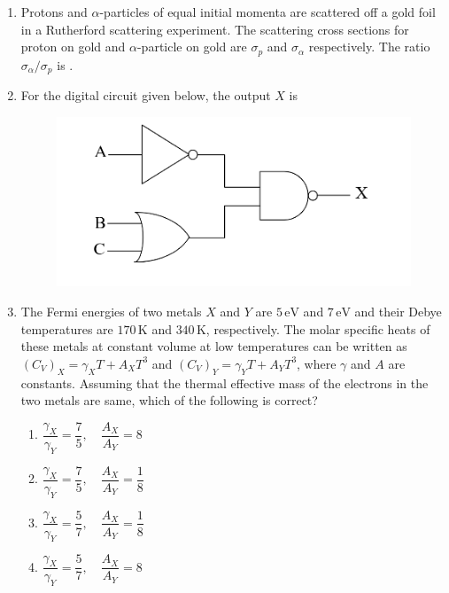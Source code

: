 \documentclass[journal,12pt,onecolumn]{IEEEtran}
\theoremstyle{remark}
\begin{document}
\begin{enumerate}
    \item Protons and $\alpha$-particles of equal initial momenta are scattered off a gold foil in a Rutherford scattering experiment. The scattering cross sections for proton on gold and $\alpha$-particle on gold are $\sigma_p$ and $\sigma_{\alpha}$ respectively. The ratio $\sigma_{\alpha}/\sigma_{p}$ is \underline{\hspace{2cm}}.
    
    \item For the digital circuit given below, the output $X$ is
    \begin{figure}[H]
    \includegraphics[width = 0.5\columnwidth]{fig/Q44.png}
    \centering
    \caption*{}
    \label{fig:Q44}
\end{figure}
\begin{enumerate}
    \end{enumerate}
    
    \item The Fermi energies of two metals $X$ and $Y$ are $5\,\textrm{eV}$ and $7\,\textrm{eV}$ and their Debye temperatures are $170\,\textrm{K}$ and $340\,\textrm{K}$, respectively. The molar specific heats of these metals at constant volume at low temperatures can be written as $(C_V)_X = \gamma_X T + A_X T^3$ and $(C_V)_Y = \gamma_Y T + A_Y T^3$, where $\gamma$ and $A$ are constants. Assuming that the thermal effective mass of the electrons in the two metals are same, which of the following is correct?
    
    \begin{multicols}{2}
    \begin{enumerate}
        \item $\dfrac{\gamma_X}{\gamma_Y} = \dfrac{7}{5}, \quad \dfrac{A_X}{A_Y} = 8$
        \item $\dfrac{\gamma_X}{\gamma_Y} = \dfrac{7}{5}, \quad \dfrac{A_X}{A_Y} = \dfrac{1}{8}$
        \item $\dfrac{\gamma_X}{\gamma_Y} = \dfrac{5}{7}, \quad \dfrac{A_X}{A_Y} = \dfrac{1}{8}$
        \item $\dfrac{\gamma_X}{\gamma_Y} = \dfrac{5}{7}, \quad \dfrac{A_X}{A_Y} = 8$
    \end{enumerate}
    \end{multicols}
    

\end{enumerate}
\end{document}
